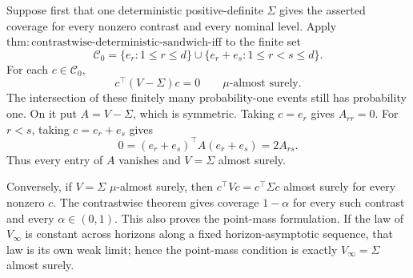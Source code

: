 Suppose first that one deterministic positive-definite \(\Sigma\) gives the asserted coverage for every nonzero contrast and every nominal level. Apply \(\mathrm{thm:contrastwise\text{-}deterministic\text{-}sandwich\text{-}iff}\) to the finite set
\[
 \mathcal C_0=\{e_r:1\le r\le d\}\cup
 \{e_r+e_s:1\le r<s\le d\}.
\tag{1}
\]
For each \(c\in\mathcal C_0\),
\[
 c^\top(V-\Sigma)c=0\qquad\mu\text{-almost surely}.
\tag{2}
\]
The intersection of these finitely many probability-one events still has probability one. On it put \(A=V-\Sigma\), which is symmetric. Taking \(c=e_r\) gives \(A_{rr}=0\). For \(r<s\), taking \(c=e_r+e_s\) gives
\[
 0=(e_r+e_s)^\top A(e_r+e_s)=2A_{rs}.
\tag{3}
\]
Thus every entry of \(A\) vanishes and \(V=\Sigma\) almost surely.

Conversely, if \(V=\Sigma\) \(\mu\)-almost surely, then \(c^\top Vc=c^\top\Sigma c\) almost surely for every nonzero \(c\). The contrastwise theorem gives coverage \(1-\alpha\) for every such contrast and every \(\alpha\in(0,1)\). This also proves the point-mass formulation. If the law of \(V_\infty\) is constant across horizons along a fixed horizon-asymptotic sequence, that law is its own weak limit; hence the point-mass condition is exactly \(V_\infty=\Sigma\) almost surely.